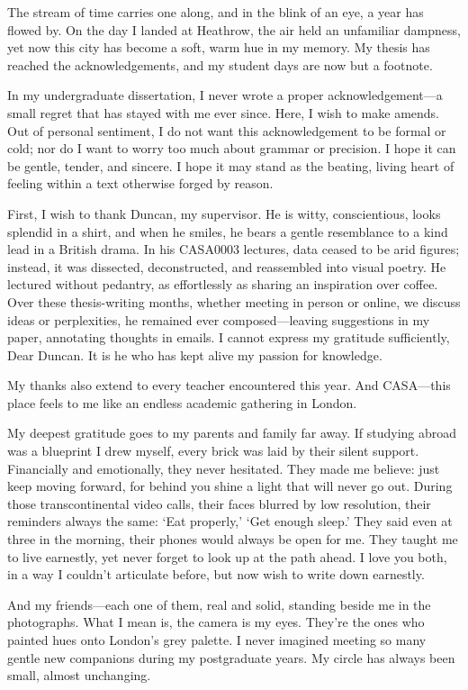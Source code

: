 \documentclass[
  12pt,
  oneside]{book}
\begin{document}
The stream of time carries one along, and in the blink of an eye, a year has flowed by. On the day I landed at Heathrow, the air held an unfamiliar dampness, yet now this city has become a soft, warm hue in my memory. My thesis has reached the acknowledgements, and my student days are now but a footnote.

In my undergraduate dissertation, I never wrote a proper acknowledgement---a small regret that has stayed with me ever since. Here, I wish to make amends. Out of personal sentiment, I do not want this acknowledgement to be formal or cold; nor do I want to worry too much about grammar or precision. I hope it can be gentle, tender, and sincere. I hope it may stand as the beating, living heart of feeling within a text otherwise forged by reason.

First, I wish to thank Duncan, my supervisor. He is witty, conscientious, looks splendid in a shirt, and when he smiles, he bears a gentle resemblance to a kind lead in a British drama. In his CASA0003 lectures, data ceased to be arid figures; instead, it was dissected, deconstructed, and reassembled into visual poetry. He lectured without pedantry, as effortlessly as sharing an inspiration over coffee. Over these thesis-writing months, whether meeting in person or online, we discuss ideas or perplexities, he remained ever composed---leaving suggestions in my paper, annotating thoughts in emails. I cannot express my gratitude sufficiently, Dear Duncan. It is he who has kept alive my passion for knowledge.

My thanks also extend to every teacher encountered this year. And CASA---this place feels to me like an endless academic gathering in London.

My deepest gratitude goes to my parents and family far away. If studying abroad was a blueprint I drew myself, every brick was laid by their silent support. Financially and emotionally, they never hesitated. They made me believe: just keep moving forward, for behind you shine a light that will never go out. During those transcontinental video calls, their faces blurred by low resolution, their reminders always the same: `Eat properly,' `Get enough sleep.' They said even at three in the morning, their phones would always be open for me. They taught me to live earnestly, yet never forget to look up at the path ahead. I love you both, in a way I couldn't articulate before, but now wish to write down earnestly.

And my friends---each one of them, real and solid, standing beside me in the photographs. What I mean is, the camera is my eyes. They're the ones who painted hues onto London's grey palette. I never imagined meeting so many gentle new companions during my postgraduate years. My circle has always been small, almost unchanging.
\end{document}
